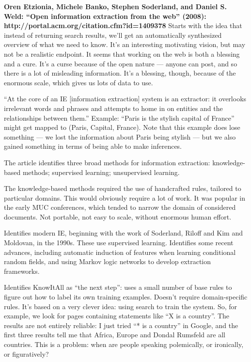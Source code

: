 \textbf{Oren Etzionia, Michele Banko, Stephen Soderland, and Daniel
  S. Weld: ``Open information extraction from the web'' (2008):
  http://portal.acm.org/citation.cfm?id=1409378} Starts with the idea
that instead of returning search results, we'll get an automatically
synthesized overview of what we need to know.  It's an interesting
motivating vision, but may not be a realistic endpoint.  It seems that
working on the web is both a blessing and a cure.  It's a curse
because of the open nature --- anyone can post, and so there is a lot
of misleading information.  It's a blessing, though, because of the
enormous scale, which gives us lots of data to use.

``At the core of an IE [information extraction] system is an
extractor: it overlooks irrelevant words and phrases and attempts to
home in on entities and the relationships between them.''  Example:
``Paris is the stylish capital of France'' might get mapped to (Paris,
Capital, France).  Note that this example does lose something --- we
lost the information about Paris being stylish --- but we also gained
something in terms of being able to make inferences.  

The article identifies three broad methods for information extraction:
knowledge-based methods; supervised learning; unsupervised learning.

The knowledge-based methods required the use of handcrafted rules,
tailored to particular domains.  This would obviously require a lot of
work.  It was popular in the early MUC conferences, which tended to
narrow the domain of considered documents.  Not portable, not easy to
scale, without enormous human effort.

Identifies modern IE, beginning with the work of Soderland, Riloff and
Kim and Moldovan, in the 1990s.  These use supervised learning.
Identifies some recent advances, including automatic induction of
features when learning conditional random fields, and using Markov
logic networks to develop extraction frameworks.  

Identifies KnowItAll as ``the next step'': uses a small number of base
rules to figure out how to label its own training examples.  Doesn't
require domain-specific rules.  It's based on a very clever idea:
using search to train the system.  So, for example, we look for pages
containing statements like ``X is a country''.  The results are not
entirely reliable: I just tried ``* is a country'' in Google, and the
first three results tell me that Africa, Europe and Dondal Rumsfeld
are all countries.  This is a problem: when are people speaking
polemically, or ironically, or figuratively?

